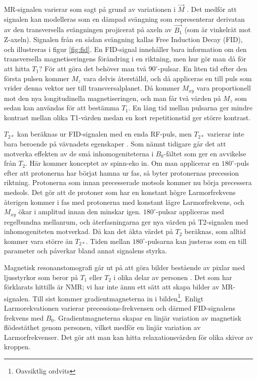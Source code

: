 \documentclass[11pt, a4paper]{article}
\begin{document}
MR-signalen varierar som sagt på grund av variationen i $\vec{M}$ \parencite{understanding_mri}. Det medför att signalen kan modelleras som en dämpad svängning som representerar derivatan av den transversella svängningen projicerat på axeln av $\vec{B_1}$ (som är vinkelrät mot Z-axeln). Signalen från en sådan svängning kallas Free Induction Decay (FID), och illustreras i figur \ref{fig:fid}. En FID-signal innehåller bara information om den transversella magnetiseringens förändring i en riktning, men hur gör man då för att hitta $T_1$? För att göra det behöver man två $90^\circ$-pulsar. En liten tid efter den första pulsen kommer $M_z$ vara delvis återställd, och då appliceras en till puls som vrider denna vektor ner till transversalplanet. Då kommer $M_{xy}$ vara proportionell mot den nya longitudinella magnetiseringen, och man får två värden på $M_z$ som sedan kan användas för att bestämma $T_1$. En lång tid mellan pulsarna ger mindre kontrast mellan olika T1-värden medan en kort repetitionstid ger större kontrast.

$T_{2*}$ kan beräknas ur FID-signalen med en enda RF-puls, men $T_{2*}$ varierar inte bara beroende på vävnadets egenskaper \parencite{understanding_mri}. Som nämnt tidigare går det att motverka effekten av de små inhomogeniteterna i $B_0$-fältet som ger en avvikelse från $T_2$. Här kommer konceptet av spinn-eko in. Om man applicerar en $180^\circ$-puls efter att protonerna har börjat hamna ur fas, så byter protonernas precession riktning. Protonerna som innan precesserade motsols kommer nu börja precessera medsols. Det gör att de protoner som har en konstant högre Larmorfrekvens återigen kommer i fas med protonerna med konstant lägre Larmorfrekvens, och $M_{xy}$ ökar i amplitud innan den minskar igen. $180^\circ$-pulsar appliceras med regelbundna mellanrum, och återfasningarna ger nya värden på T2-signalen med inhomogeniteten motverkad. Då kan det äkta värdet på $T_2$ beräknas, som alltid kommer vara större än $T_{2*}$. Tiden mellan $180^\circ$-pulsarna kan justeras som en till parameter och påverkar bland annat signalens styrka.

Magnetisk resonanstomografi går ut på att göra bilder bestående av pixlar med ljusstyrkor som beror på $T_1$ eller $T_2$ i olika delar av personen \parencite{understanding_mri}. Det som har förklarats hittills är NMR; vi har inte ännu ett sätt att skapa bilder av MR-signalen. Till sist kommer gradientmagneterna in i bilden\footnote{Oavsiktlig ordvits}. Enligt Larmorekvationen varierar precessions-frekvensen och därmed FID-signalens frekvens med $B_0$. Gradientmagneterna skapar en linjär variation av magnetisk flödestäthet genom personen, vilket medför en linjär variation av Larmorfrekvenser. Det gör att man kan hitta relaxationsvärden för olika skivor av kroppen. 
\end{document}
